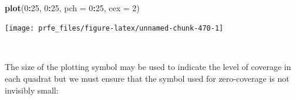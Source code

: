 \documentclass[12pt,a4paper]{book}
\newenvironment{Shaded}{\begin{snugshade}}{\end{snugshade}}
\newcommand{\DataTypeTok}[1]{\textcolor[rgb]{0.13,0.29,0.53}{#1}}
\newcommand{\DecValTok}[1]{\textcolor[rgb]{0.00,0.00,0.81}{#1}}
\newcommand{\KeywordTok}[1]{\textcolor[rgb]{0.13,0.29,0.53}{\textbf{#1}}}
\newcommand{\NormalTok}[1]{#1}
\newcommand{\OperatorTok}[1]{\textcolor[rgb]{0.81,0.36,0.00}{\textbf{#1}}}
\newcommand{\StringTok}[1]{\textcolor[rgb]{0.31,0.60,0.02}{#1}}
\theoremstyle{definition}
\theoremstyle{definition}
\theoremstyle{definition}
\theoremstyle{remark}
\begin{document}
~

\begin{Shaded}
\begin{Highlighting}[]
\KeywordTok{plot}\NormalTok{(}\DecValTok{0}\OperatorTok{:}\DecValTok{25}\NormalTok{, }\DecValTok{0}\OperatorTok{:}\DecValTok{25}\NormalTok{, }\DataTypeTok{pch =} \DecValTok{0}\OperatorTok{:}\DecValTok{25}\NormalTok{, }\DataTypeTok{cex =} \DecValTok{2}\NormalTok{)}
\end{Highlighting}
\end{Shaded}

\begin{center}\texttt{[image: prfe\_files/figure-latex/unnamed-chunk-470-1]} \end{center}

~

The size of the plotting symbol may be used to indicate the level of
coverage in each quadrat but we must ensure that the symbol used for
zero-coverage is not invisibly small:

~

\begin{Shaded}
\end{Shaded}
\end{document}
